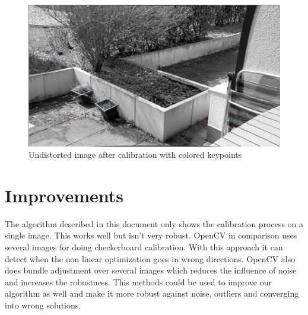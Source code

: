 \documentclass[11pt,a4paper,titlepage,oneside]{report}
\begin{document}
\begin{figure}[H]
  \begin{center}
		\includegraphics[width=1.0\textwidth]{img/calib_output.png}
  \end{center}
	\caption{Undistorted image after calibration with colored keypoints}\label{fig:undistorted}
\end{figure}

\section{Improvements}\label{sec:improvements}
The algorithm described in this document only shows the calibration process on a single image. This works well but isn't very robust. OpenCV in comparison uses several images for doing checkerboard calibration. With this approach it can detect when the non linear optimization goes in wrong directions. OpenCV also does bundle adjustment over several images which reduces the influence of noise and increases the robustness. This methods could be used to improve our algorithm as well and make it more robust against noise, outliers and converging into wrong solutions.
\end{document}
